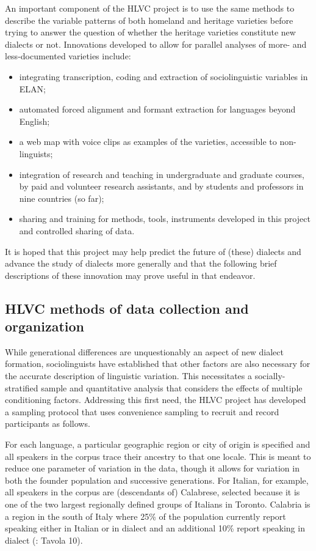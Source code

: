 \documentclass[output=paper]{LSP/langsci}
\begin{document}
An important component of the HLVC project is to use the same methods to describe the variable patterns of both homeland and heritage varieties before trying to answer the question of whether the heritage varieties constitute new dialects or not. Innovations developed to allow for parallel analyses of more- and less-documented varieties include: 

\begin{itemize}
\item integrating transcription, coding and extraction of sociolinguistic variables in ELAN; 

\item automated forced alignment and formant extraction for languages beyond English; 

\item a web map with voice clips as examples of the varieties, accessible to non-linguists; 

\item integration of research and teaching in undergraduate and graduate courses, by paid and volunteer research assistants, and by students and professors in nine countries (so far); 

\item sharing and training for methods, tools, instruments developed in this project and controlled sharing of data. 
\end{itemize}

It is hoped that this project may help predict the future of (these) dialects and advance the study of dialects more generally and that the following brief descriptions of these innovation may prove useful in that endeavor.

\subsection{HLVC methods of data collection and organization}

While generational differences are unquestionably an aspect of new dialect formation, sociolinguists have established that other factors are also necessary for the accurate description of linguistic variation. This necessitates a socially-stratified sample and quantitative analysis that considers the effects of multiple conditioning factors. Addressing this first need, the HLVC project has developed a sampling protocol that uses convenience sampling to recruit and record participants as follows.

For each language, a particular geographic region or city of origin is specified and all speakers in the corpus trace their ancestry to that one locale. This is meant to reduce one parameter of variation in the data, though it allows for variation in both the founder population and successive generations. For Italian, for example, all speakers in the corpus are (descendants of) Calabrese, selected because it is one of the two largest regionally defined groups of Italians in Toronto. Calabria is a region in the south of Italy where 25\% of the population currently report speaking either in Italian or in dialect and an additional 10\% report speaking in dialect (\citealt{istat_istituto_nazionale_di_statistica_lingua_2007}: Tavola 10). 
\end{document}
